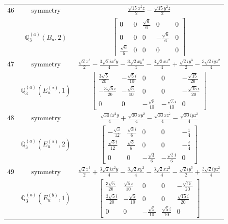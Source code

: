 \documentclass[fleqn,8pt,landscape]{jsarticle}
\begin{document}
\begin{longtable}{ccc}
$ 46 $ & $ \text{symmetry} $ & $ \frac{\sqrt{15} x^{2} z}{2} - \frac{\sqrt{15} y^{2} z}{2} $ \\
$  $ & $ \mathbb{Q}_{3}^{(a)}(B_{u},2) $ & $ \begin{bmatrix} 0 & 0 & \frac{\sqrt{6}}{6} & 0 & 0 \\ 0 & 0 & 0 & - \frac{\sqrt{6}}{6} & 0 \\ \frac{\sqrt{6}}{6} & 0 & 0 & 0 & 0 \end{bmatrix} $ \\ \hline
$ 47 $ & $ \text{symmetry} $ & $ \frac{\sqrt{2} x^{3}}{2} - \frac{3 \sqrt{2} i x^{2} y}{4} - \frac{3 \sqrt{2} x y^{2}}{4} - \frac{3 \sqrt{2} x z^{2}}{4} + \frac{\sqrt{2} i y^{3}}{2} - \frac{3 \sqrt{2} i y z^{2}}{4} $ \\
$  $ & $ \mathbb{Q}_{3}^{(a)}(E_{u}^{(a)},1) $ & $ \begin{bmatrix} \frac{3 \sqrt{5}}{20} & - \frac{\sqrt{5} i}{10} & 0 & 0 & - \frac{\sqrt{15}}{20} \\ - \frac{3 \sqrt{5} i}{20} & - \frac{\sqrt{5}}{10} & 0 & 0 & - \frac{\sqrt{15} i}{20} \\ 0 & 0 & - \frac{\sqrt{5}}{10} & - \frac{\sqrt{5} i}{10} & 0 \end{bmatrix} $ \\ \hline
$ 48 $ & $ \text{symmetry} $ & $ \frac{\sqrt{30} i x^{2} y}{4} + \frac{\sqrt{30} x y^{2}}{4} - \frac{\sqrt{30} x z^{2}}{4} - \frac{\sqrt{30} i y z^{2}}{4} $ \\
$  $ & $ \mathbb{Q}_{3}^{(a)}(E_{u}^{(a)},2) $ & $ \begin{bmatrix} - \frac{\sqrt{3}}{12} & \frac{\sqrt{3} i}{6} & 0 & 0 & - \frac{1}{4} \\ \frac{\sqrt{3} i}{12} & \frac{\sqrt{3}}{6} & 0 & 0 & - \frac{i}{4} \\ 0 & 0 & - \frac{\sqrt{3}}{6} & - \frac{\sqrt{3} i}{6} & 0 \end{bmatrix} $ \\ \hline
$ 49 $ & $ \text{symmetry} $ & $ \frac{\sqrt{2} x^{3}}{2} + \frac{3 \sqrt{2} i x^{2} y}{4} - \frac{3 \sqrt{2} x y^{2}}{4} - \frac{3 \sqrt{2} x z^{2}}{4} - \frac{\sqrt{2} i y^{3}}{2} + \frac{3 \sqrt{2} i y z^{2}}{4} $ \\
$  $ & $ \mathbb{Q}_{3}^{(a)}(E_{u}^{(b)},1) $ & $ \begin{bmatrix} \frac{3 \sqrt{5}}{20} & \frac{\sqrt{5} i}{10} & 0 & 0 & - \frac{\sqrt{15}}{20} \\ \frac{3 \sqrt{5} i}{20} & - \frac{\sqrt{5}}{10} & 0 & 0 & \frac{\sqrt{15} i}{20} \\ 0 & 0 & - \frac{\sqrt{5}}{10} & \frac{\sqrt{5} i}{10} & 0 \end{bmatrix} $ \\ \hline

\end{longtable}
\end{document}
